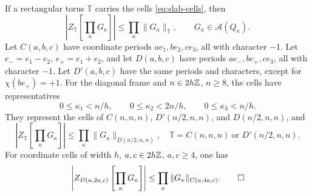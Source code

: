 \begin{proposition}\label{thm:slab-chessboard}
If a rectangular torus $\mathbb T$ carries the cells
\eqref{eq:slab-cells}, then
\begin{equation}\label{eq:slab-chessboard-rectangular}
 \left|Z_{\mathbb T}\left[\prod_{\kappa}G_\kappa\right]\right|
                       \le\prod_\kappa\|G_\kappa\|_{\mathbb T},
 \qquad G_\kappa\in\mathcal A(Q_\kappa).
\end{equation}
Let $C(a,b,c)$ have coordinate periods $ae_1,be_2,ce_3$,
all with character $-1$.
Let $e_-=e_1-e_2$, $e_+=e_1+e_2$, and let $D(a,b,c)$ have periods
$ae_-,be_+,ce_3$, all with character $-1$. Let $D'(a,b,c)$ have the
same periods and characters, except for $\chi(be_+)=+1$.
For the diagonal frame and $n\in2h\mathbb Z$, $n\ge8$, the cells have
representatives
\[
 0\le\kappa_1<n/h,\qquad 0\le\kappa_2<2n/h,
                     \qquad0\le\kappa_3<n/h.
\]
They represent the cells of $C(n,n,n)$, $D'(n/2,n,n)$, and
$D(n/2,n,n)$, and
\begin{equation}\label{eq:slab-chessboard-diagonal}
 \left|Z_{\mathbb T}\left[\prod_\kappa G_\kappa\right]\right|
           \le\prod_\kappa\|G_\kappa\|_{D(n/2,n,n)},
 \quad \mathbb T=C(n,n,n)\ \text{or }D'(n/2,n,n).
\end{equation}
For coordinate cells of width $h$, $a,c\in2h\mathbb Z$, $a,c\ge4$, one has
\begin{equation}\label{eq:slab-chessboard-coordinate}
 \left|Z_{D(a,2a,c)}\left[\prod_\kappa G_\kappa\right]\right|
                \le\prod_\kappa\|G_\kappa\|_{C(a,4a,c)}.\qedhere
\end{equation}
\end{proposition}

